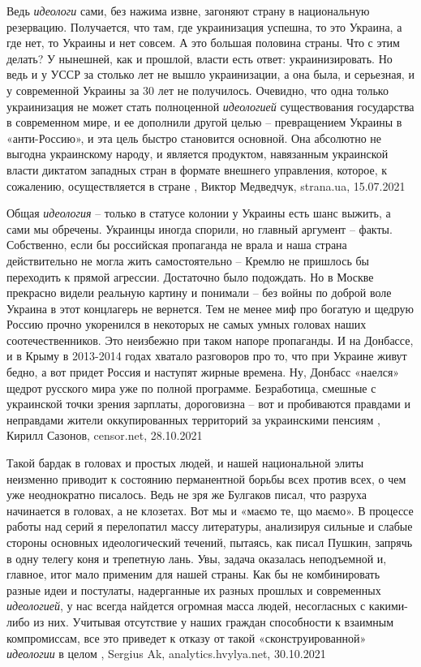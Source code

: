 Ведь \emph{идеологи} сами, без нажима извне, загоняют страну в национальную
резервацию. Получается, что там, где украинизация успешна, то это Украина, а
где нет, то Украины и нет совсем. А это большая половина страны. Что с этим
делать? У нынешней, как и прошлой, власти есть ответ: украинизировать. Но ведь
и у УССР за столько лет не вышло украинизации, а она была, и серьезная, и у
современной Украины за 30 лет не получилось. Очевидно, что одна только
украинизация не может стать полноценной \emph{идеологией} существования государства в
современном мире, и ее дополнили другой целью – превращением Украины в
«анти-Россию», и эта цель быстро становится основной.  Она абсолютно не выгодна
украинскому народу, и является продуктом, навязанным украинской власти диктатом
западных стран в формате внешнего управления, которое, к сожалению,
осуществляется в стране
, 
Виктор Медведчук, strana.ua, 15.07.2021

Общая \emph{идеология} – только в статусе колонии у Украины есть шанс выжить, а
сами мы обречены. Украинцы иногда спорили, но главный аргумент – факты.
Собственно, если бы российская пропаганда не врала и наша страна действительно
не могла жить самостоятельно – Кремлю не пришлось бы переходить к прямой
агрессии.  Достаточно было подождать. Но в Москве прекрасно видели реальную
картину и понимали – без войны по доброй воле Украина в этот концлагерь не
вернется.  Тем не менее миф про богатую и щедрую Россию прочно укоренился в
некоторых не самых умных головах наших соотечественников. Это неизбежно при
таком напоре пропаганды. И на Донбассе, и в Крыму в 2013-2014 годах хватало
разговоров про то, что при Украине живут бедно, а вот придет Россия и наступят
жирные времена.  Ну, Донбасс «наелся» щедрот русского мира уже по полной
программе. Безработица, смешные с украинской точки зрения зарплаты, дороговизна
– вот и пробиваются правдами и неправдами жители оккупированных территорий за
украинскими пенсиям 
, Кирилл Сазонов, censor.net, 28.10.2021%

Такой бардак в головах и простых людей, и нашей национальной элиты неизменно
приводит к состоянию перманентной борьбы всех против всех, о чем уже
неоднократно писалось. Ведь не зря же Булгаков писал, что разруха начинается в
головах, а не клозетах. Вот мы и «маємо те, що маємо».
В процессе работы над серий я перелопатил массу литературы, анализируя сильные
и слабые стороны основных идеологический течений, пытаясь, как писал Пушкин,
запрячь в одну телегу коня и трепетную лань. Увы, задача оказалась неподъемной
и, главное, итог мало применим для нашей страны. Как бы не комбинировать разные
идеи и постулаты, надерганные их разных прошлых и современных \emph{идеологией}, у нас
всегда найдется огромная масса людей, несогласных с какими-либо из них.
Учитывая отсутствие у наших граждан способности к взаимным компромиссам, все
это приведет к отказу от такой «сконструированной» \emph{идеологии} в целом
, Sergius Ak, analytics.hvylya.net, 30.10.2021
